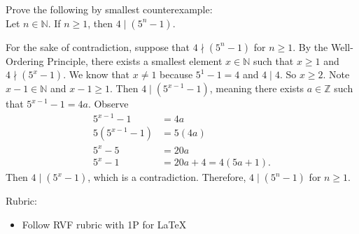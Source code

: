 \documentclass{article}
\newcommand{\Z}{\mathbb{Z}}
\theoremstyle{definition}
\begin{document}
\begin{question}
    Prove the following by smallest counterexample:\\
    Let $n\in \mathbb{N}$. If $n\geq 1$, then $4 \mid (5^n-1)$.
\end{question}
\begin{solution}
      For the sake of contradiction, suppose that $4 \nmid (5^n-1)$ for $n\geq 1$. By the Well-Ordering Principle, there exists a smallest element $x\in \mathbb{N}$ such that $x\geq 1$ and $4 \nmid (5^x-1)$. We know that $x\neq 1$ because $5^1-1=4$ and $4\mid 4$. So $x\geq 2$. Note $x-1\in \mathbb{N}$ and $x-1\geq 1$. Then $4\mid (5^{x-1}-1)$, meaning there exists $a\in \Z$ such that $5^{x-1}-1 = 4a$. Observe
      \begin{align*}
      5^{x-1}-1 &= 4a\\
      5(5^{x-1}-1) &= 5(4a)\\
      5^x - 5 &= 20a\\
      5^x -1 &= 20a +4 = 4(5a+1).
      \end{align*}
      Then $4\mid (5^x-1)$, which is a contradiction. Therefore, $4 \mid (5^n-1)$ for $n\geq 1$.
{\color{red} Rubric:
\begin{itemize}
\item Follow RVF rubric with 1P for \LaTeX
\end{itemize}}
\end{solution}
\end{document}
